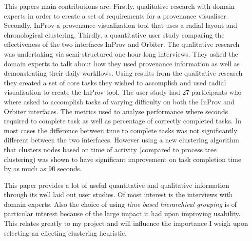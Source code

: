 This papers main contributions are: Firstly, qualitative research with domain experts in order to create a set of requirements for a provenance visualiser. Secondly, InProv a provenance visualization tool that uses a radial layout and chronological clustering. Thirdly, a quantitative user study comparing the effectiveness of the two interfaces InProv and Orbiter. The qualitative research was undertaking via semi-structured one hour long interviews. They asked the domain experts to talk about how they used provenance information as well as demonstrating their daily workflows. Using results from the qualitative research they created a set of core tasks they wished to accomplish and used radial visualisation to create the InProv tool. The user study had 27 participants who where asked to accomplish tasks of varying difficulty on both the InProv and Orbiter interfaces. The metrics used to analyse performance where seconds required to complete task as well as percentage of correctly completed tasks. In most cases the difference between time to complete tasks was not significantly different between the two interfaces. However using a new clustering algorithm that clusters nodes based on time of activity (compared to process tree clustering) was shown to have significant improvement on task completion time by as much as 90 seconds.

This paper provides a lot of useful quantitative and qualitative information through its well laid out user studies. Of most interest is the interviews with domain experts. Also the choice of using \textit{time based hierarchical grouping} is of particular interest because of the large impact it had upon improving usability. This relates greatly to my project and will influence the importance I weigh upon selecting an effecting clustering heuristic. 
